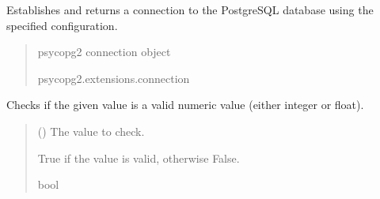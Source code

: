 \documentclass[letterpaper,10pt,english]{sphinxmanual}
\begin{document}

\begin{fulllineitems}
\label{\detokenize{modules.data_storage:modules.data_storage.llm_standardize.get_connection}}
\pysigstartsignatures
\pysiglinewithargsret
{}
{}
{}
\pysigstopsignatures
\sphinxAtStartPar
Establishes and returns a connection to the PostgreSQL database using the specified configuration.
\begin{quote}\begin{description}
\sphinxAtStartPar
psycopg2 connection object

\sphinxAtStartPar
psycopg2.extensions.connection

\end{description}\end{quote}

\end{fulllineitems}


\begin{fulllineitems}
\label{\detokenize{modules.data_storage:modules.data_storage.llm_standardize.is_valid_number}}
\pysigstartsignatures
\pysiglinewithargsret
{}
{}
{}
\pysigstopsignatures
\sphinxAtStartPar
Checks if the given value is a valid numeric value (either integer or float).
\begin{quote}\begin{description}
\sphinxAtStartPar
{} () \textendash{} The value to check.

\sphinxAtStartPar
True if the value is valid, otherwise False.

\sphinxAtStartPar
bool

\end{description}\end{quote}

\end{fulllineitems}
\end{document}
